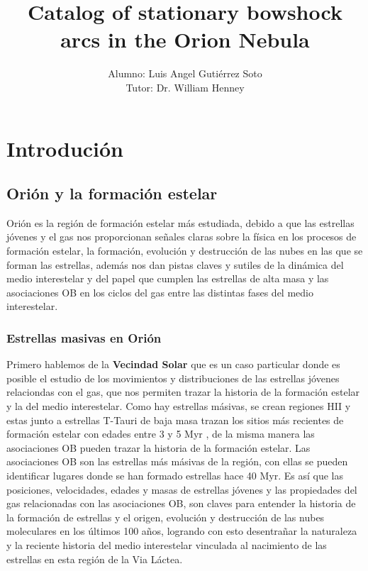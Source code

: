 \documentclass{article}
\title{Catalog of stationary bowshock arcs in the Orion Nebula}
\author{
  Alumno: Luis Angel Gutiérrez Soto\\
  Tutor: Dr. William Henney
}
\begin{document}
\maketitle

\section{Introdución}
\label{sec:introduction}

\subsection{ Orión y la formación estelar}
\label{sec:formation} 


Orión es la región de formación estelar más estudiada, debido a que las estrellas jóvenes y el gas nos proporcionan señales claras sobre la física en los procesos de formación estelar, la formación, evolución  y destrucción de las nubes en las que se forman las estrellas, además nos dan pistas claves y sutiles de la dinámica del medio interestelar y del papel que cumplen las estrellas de alta masa y las asociaciones OB en los ciclos del gas entre las distintas fases del medio interestelar.\\

\subsubsection{Estrellas masivas en Orión}
\label{sec:star}

Primero hablemos de la \textbf{Vecindad Solar} que es un caso particular donde es posible el estudio de los movimientos y distribuciones de las estrellas jóvenes relaciondas con el gas, que nos permiten trazar la historia de la formación estelar y la del medio interestelar. Como hay estrellas másivas, se crean regiones HII y estas junto a estrellas T-Tauri de baja masa trazan los sitios más recientes de formación estelar con edades entre 3 y 5 Myr \citep{Bally:2008a}, de la misma manera las asociaciones OB pueden trazar la historia de la formación estelar. Las asociaciones OB son las estrellas más másivas de la región, con ellas se pueden identificar lugares donde se han formado estrellas hace 40 Myr. Es así que las posiciones, velocidades, edades y masas de estrellas jóvenes y las propiedades del gas relacionadas con las asociaciones OB, son claves para entender la historia de la formación de estrellas y el origen, evolución y destrucción de las nubes moleculares en los últimos 100 años, logrando con esto desentrañar la naturaleza y la reciente historia del medio interestelar vinculada al nacimiento de las estrellas en esta región de la Via Láctea.\\
\end{document}
